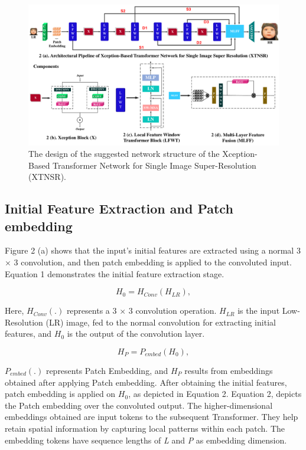 \documentclass[twocolumn]{svjour3}          %
\begin{document}
\begin{figure}
    \centering
    \includegraphics[width=\linewidth]{2Figure.pdf}
    \caption{The design of the suggested network structure of the Xception-Based Transformer Network for Single Image Super-Resolution (XTNSR).}
    \label{fig:2}
\end{figure}

\subsection{Initial Feature Extraction and Patch embedding}
Figure 2 (a) shows that the input's initial features are extracted using a normal 3 × 3 convolution, and then patch embedding is applied to the convoluted input. Equation 1 demonstrates the initial feature extraction stage. 

\begin{equation}
{H_{0}}= {H_{Conv}}({H_{LR}}),
\end{equation}

Here, ${H_{Conv}}$$(.)$ represents a 3 $\times$ 3 convolution operation. ${H_{LR}}$ is the input Low-Resolution (LR) image, fed to the normal convolution for extracting initial features, and ${H_{0}}$ is the output of the convolution layer. 


\begin{equation}
{H_{P}}= {P_{embed}}({H_{0}}),
\end{equation}

${P_{embed}}$$(.)$ represents Patch Embedding, and ${H_{P}}$ results from embeddings obtained after applying Patch embedding. After obtaining the initial features, patch embedding is applied on ${H_{0}}$, as depicted in Equation 2. Equation 2, depicts the Patch embedding over the convoluted output. The higher-dimensional embeddings obtained are input tokens to the subsequent Transformer. They help retain spatial information by capturing local patterns within each patch. The embedding tokens have sequence lengths of \textit{L} and \textit{P} as embedding dimension. 
\end{document}
